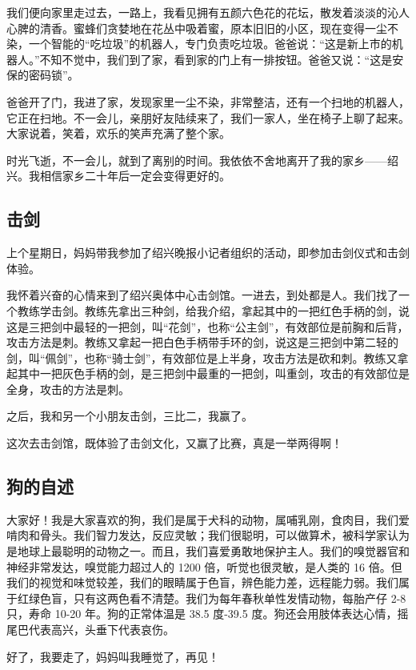 \documentclass[UTF8,a4paper,titlepage,twoside,10.5pt]{article}
\begin{document}
我们便向家里走过去，一路上，我看见拥有五颜六色花的花坛，散发着淡淡的沁人心脾的清香。蜜蜂们贪婪地在花丛中吸着蜜，原本旧旧的小区，现在变得一尘不染，一个智能的“吃垃圾”的机器人，专门负责吃垃圾。爸爸说：“这是新上市的机器人。”不知不觉中，我们到了家，看到家的门上有一排按钮。爸爸又说：“这是安保的密码锁”。

爸爸开了门，我进了家，发现家里一尘不染，非常整洁，还有一个扫地的机器人，它正在扫地。不一会儿，亲朋好友陆续来了，我们一家人，坐在椅子上聊了起来。大家说着，笑着，欢乐的笑声充满了整个家。

时光飞逝，不一会儿，就到了离别的时间。我依依不舍地离开了我的家乡——绍兴。我相信家乡二十年后一定会变得更好的。

\subsection{击剑}
\label{sec:orgd95b624}

上个星期日，妈妈带我参加了绍兴晚报小记者组织的活动，即参加击剑仪式和击剑体验。

我怀着兴奋的心情来到了绍兴奥体中心击剑馆。一进去，到处都是人。我们找了一个教练学击剑。教练先拿出三种剑，给我介绍，拿起其中的一把红色手柄的剑，说这是三把剑中最轻的一把剑，叫“花剑”，也称“公主剑”，有效部位是前胸和后背，攻击方法是刺。教练又拿起一把白色手柄带手环的剑，说这是三把剑中第二轻的剑，叫“佩剑”，也称“骑士剑”，有效部位是上半身，攻击方法是砍和刺。教练又拿起其中一把灰色手柄的剑，是三把剑中最重的一把剑，叫重剑，攻击的有效部位是全身，攻击的方法是刺。

之后，我和另一个小朋友击剑，三比二，我赢了。

这次去击剑馆，既体验了击剑文化，又赢了比赛，真是一举两得啊！

\subsection{狗的自述}
\label{sec:org44c7b00}

大家好！我是大家喜欢的狗，我们是属于犬科的动物，属哺乳刚，食肉目，我们爱啃肉和骨头。我们智力发达，反应灵敏；我们很聪明，可以做算术，被科学家认为是地球上最聪明的动物之一。而且，我们喜爱勇敢地保护主人。我们的嗅觉器官和神经非常发达，嗅觉能力超过人的 1200 倍，听觉也很灵敏，是人类的 16 倍。但我们的视觉和味觉较差，我们的眼睛属于色盲，辨色能力差，远程能力弱。我们属于红绿色盲，只有这两色看不清楚。我们为每年春秋单性发情动物，每胎产仔 2-8 只，寿命 10-20 年。狗的正常体温是 38.5 度-39.5 度。狗还会用肢体表达心情，摇尾巴代表高兴，头垂下代表哀伤。

好了，我要走了，妈妈叫我睡觉了，再见！
\end{document}
